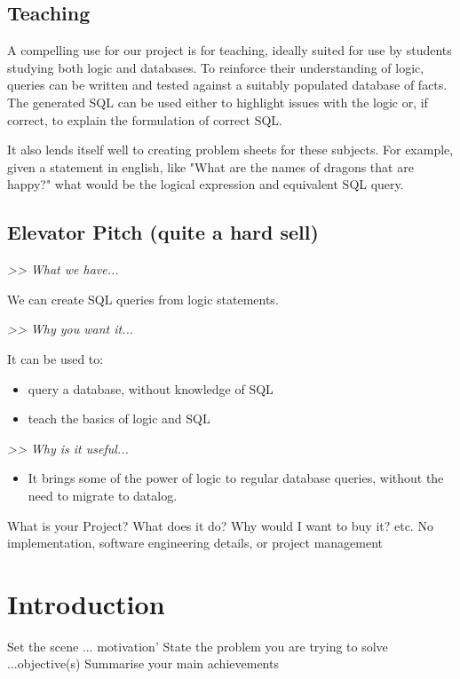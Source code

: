 \documentclass[a4paper, 11pt]{article}
\begin{document}
  \subsection*{Teaching}

  A compelling use for our project is for teaching, ideally suited for use 
  by students studying both logic and databases. To reinforce their 
  understanding of logic, queries can be written and tested against a suitably
  populated database of facts. The generated SQL can be used either to 
  highlight issues with the logic or, if correct, to explain the formulation
  of correct SQL.

  It also lends itself well to creating problem sheets for these subjects.
  For example, given a statement in english, like "What are the names of
  dragons that are happy?" what would be the logical expression and equivalent
  SQL query.

  \subsection*{Elevator Pitch (quite a hard sell)}
  \emph{>> What we have...}
  
  We can create SQL queries from logic statements.
  
  \emph{>> Why you want it...}

   It can be used to:
   \begin{itemize}
     \item query a database, without knowledge of SQL
     \item teach the basics of logic and SQL
   \end{itemize}

   \emph{>> Why is it useful...}
   \begin{itemize}
     \item It brings some of the power of logic to regular database queries,
     without the need to migrate to datalog.
    \end{itemize}

  What is your Project? What does it do? Why would I want to buy it? etc.
  No implementation, software engineering details, or project management

\section{Introduction}

  Set the scene ... motivation'
  State the problem you are trying to solve ...objective(s)
  Summarise your main achievements 
\end{document}
